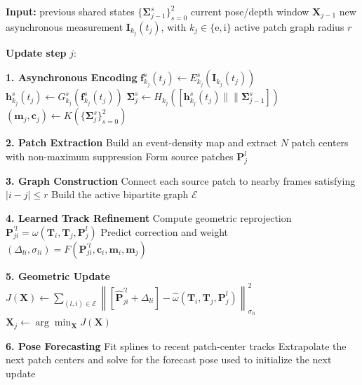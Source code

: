 \documentclass[11pt]{article}
\newcommand{\concat}{\mathbin{\|\!\|}}
\newcommand{\state}{\boldsymbol{\Sigma}}
\begin{document}
\begin{algorithm}[h]
\caption{Asynchronous RAMP-VO Update}
\begin{algorithmic}[1]
\State \textbf{Input:}
    \Statex \hspace{\algorithmicindent} previous shared states \(\{\state_{j-1}^{s}\}_{s=0}^{2}\)
    \Statex \hspace{\algorithmicindent} current pose/depth window \(\mathbf{X}_{j-1}\)
    \Statex \hspace{\algorithmicindent} new asynchronous measurement \(\mathbf{I}_{k_j}(t_j)\), with \(k_j\in\{\mathrm{e},\mathrm{i}\}\)
    \Statex \hspace{\algorithmicindent} active patch graph radius \(r\)

\State \textbf{Update step} \(j\):

\Statex \textbf{1. Asynchronous Encoding}
    \State \(\mathbf{f}_{k_j}^{s}(t_j) \gets E_{k_j}^{s}(\mathbf{I}_{k_j}(t_j))\)
    \State \(\mathbf{h}_{k_j}^{s}(t_j) \gets G_{k_j}^{s}(\mathbf{f}_{k_j}^{s}(t_j))\)
    \State \(\state_j^{s} \gets H_{k_j}([\mathbf{h}_{k_j}^{s}(t_j)\concat \state_{j-1}^{s}])\)
\EndFor
\State \((\mathbf{m}_j,\mathbf{c}_j) \gets K(\{\state_j^s\}_{s=0}^{2})\)

\Statex \textbf{2. Patch Extraction}
\State Build an event-density map and extract \(N\) patch centers with non-maximum suppression
\State Form source patches \(\mathbf{P}_j^l\)

\Statex \textbf{3. Graph Construction}
\State Connect each source patch to nearby frames satisfying \(|i-j|\le r\)
\State Build the active bipartite graph \(\mathcal{E}\)

\Statex \textbf{4. Learned Track Refinement}
    \State Compute geometric reprojection \(\mathbf{P}_{ji}^{\prime l} = \omega(\mathbf{T}_i,\mathbf{T}_j,\mathbf{P}_j^l)\)
    \State Predict correction and weight \((\Delta_{li},\sigma_{li}) = F(\mathbf{P}_{ji}^{\prime l},\mathbf{c}_i,\mathbf{m}_i,\mathbf{m}_j)\)
\EndFor

\Statex \textbf{5. Geometric Update}
\State \(J(\mathbf{X}) \gets \sum_{(l,i)\in \mathcal{E}} \left\| \left[\hat{\mathbf{P}}_{ji}^{\prime l} + \Delta_{li}\right] - \hat{\omega}(\mathbf{T}_i,\mathbf{T}_j,\mathbf{P}_j^l) \right\|_{\sigma_{li}}^2\)
\State \(\mathbf{X}_{j} \gets \arg\min_{\mathbf{X}} J(\mathbf{X})\) 

\Statex \textbf{6. Pose Forecasting}
\State Fit splines to recent patch-center tracks
\State Extrapolate the next patch centers and solve for the forecast pose used to initialize the next update
\end{algorithmic}
\end{algorithm}
\end{document}
